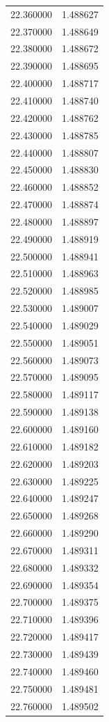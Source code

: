 \begin{tabular}{rr}
22.360000 & 1.488627 \\
22.370000 & 1.488649 \\
22.380000 & 1.488672 \\
22.390000 & 1.488695 \\
22.400000 & 1.488717 \\
22.410000 & 1.488740 \\
22.420000 & 1.488762 \\
22.430000 & 1.488785 \\
22.440000 & 1.488807 \\
22.450000 & 1.488830 \\
22.460000 & 1.488852 \\
22.470000 & 1.488874 \\
22.480000 & 1.488897 \\
22.490000 & 1.488919 \\
22.500000 & 1.488941 \\
22.510000 & 1.488963 \\
22.520000 & 1.488985 \\
22.530000 & 1.489007 \\
22.540000 & 1.489029 \\
22.550000 & 1.489051 \\
22.560000 & 1.489073 \\
22.570000 & 1.489095 \\
22.580000 & 1.489117 \\
22.590000 & 1.489138 \\
22.600000 & 1.489160 \\
22.610000 & 1.489182 \\
22.620000 & 1.489203 \\
22.630000 & 1.489225 \\
22.640000 & 1.489247 \\
22.650000 & 1.489268 \\
22.660000 & 1.489290 \\
22.670000 & 1.489311 \\
22.680000 & 1.489332 \\
22.690000 & 1.489354 \\
22.700000 & 1.489375 \\
22.710000 & 1.489396 \\
22.720000 & 1.489417 \\
22.730000 & 1.489439 \\
22.740000 & 1.489460 \\
22.750000 & 1.489481 \\
22.760000 & 1.489502 \\

\end{tabular}
